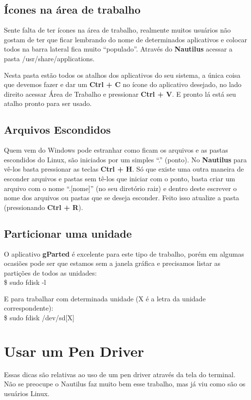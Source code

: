 \subsection{Ícones na área de trabalho}
Sente falta de ter ícones na área de trabalho, realmente muitos usuários não gostam de ter que ficar lembrando do nome de determinados aplicativos e colocar todos na barra lateral fica muito ``populado''. Através do \textbf{Nautilus} acessar a pasta /usr/share/applications. 

Nesta pasta estão todos os atalhos dos aplicativos do seu sistema, a única coisa que devemos fazer e dar um \textbf{Ctrl + C} no ícone do aplicativo desejado, no lado direito acessar Área de Trabalho e pressionar \textbf{Ctrl + V}. E pronto lá está seu atalho pronto para ser usado.

\subsection{Arquivos Escondidos}
Quem vem do Windows pode estranhar como ficam os arquivos e as pastas escondidos do Linux, são iniciados por um simples ``.'' (ponto). No \textbf{Nautilus} para vê-los  basta pressionar as teclas \textbf{Ctrl + H}. Só que existe uma outra maneira de esconder arquivos e pastas sem tê-los que iniciar com o ponto, basta criar um arquivo com o nome ``.[nome]'' (no seu diretório raiz) e dentro deste escrever o nome dos arquivos ou pastas que se deseja esconder. Feito isso atualize a pasta (pressionando \textbf{Ctrl + R}).

\subsection{Particionar uma unidade}
O aplicativo \textbf{gParted} é excelente para este tipo de trabalho, porém em algumas ocasiões pode ser que estamos sem a janela gráfica e precisamos listar as partições de todos as unidades: \\
{\ttfamily\$ sudo fdisk -l}

E para trabalhar com determinada unidade (X é a letra da unidade correspondente): \\
{\ttfamily\$ sudo fdisk /dev/sd[X]}

\section{Usar um Pen Driver}
Essas dicas são relativas ao uso de um pen driver através da tela do terminal. Não se preocupe o Nautilus faz muito bem esse trabalho, mas já viu como são os usuários Linux.

